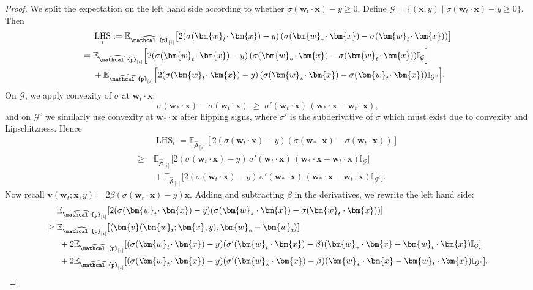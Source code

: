 \documentclass[11pt]{article}
\numberwithin{thm}{section}
\theoremstyle{plain}
\theoremstyle{definition}
\theoremstyle{remark} \newtheorem{remark}[thm]{Remark}
\def\vv{{\bm{v}}}
\def\vw{{\bm{w}}}
\def\vx{{\bm{x}}}
\def\ep{\widehat{\mathcal{p}}}
\def\cG{{\mathcal{G}}}
\newcommand{\E}{\mathbb{E}}
\newcommand{\Ind}{\mathbb{I}}
\newcommand{\innp}[1]{\langle #1 \rangle}
\newcommand{\epi}{\ep_{[i]}}
\DeclareMathOperator{\LHS}{LHS}
\begin{document}
\begin{proof}
	We split the expectation on the left hand side according to whether $\sigma(\vw_t\!\cdot\vx)-y\ge0$.  Define %
    \(\cG = \{(\vx,y)\mid \sigma(\vw_t\!\cdot\vx)-y\ge0\}\). Then
	\begin{align*}
		&\; \LHS_{i} :=  \E_{\epi}\bigl[2(\sigma(\vw_t\!\cdot\vx)-y)\,(\sigma(\vw_*\!\cdot\vx)-\sigma(\vw_t\!\cdot\vx))\bigr]\\
		=&\;\E_{\epi}\Bigl[2(\sigma(\vw_t\!\cdot\vx)-y)\,(\sigma(\vw_*\!\cdot\vx)-\sigma(\vw_t\!\cdot\vx))\Ind_{\cG}\Bigr]\\
	&\;+
		\E_{\epi}\Bigl[2(\sigma(\vw_t\!\cdot\vx)-y)\,(\sigma(\vw_*\!\cdot\vx)-\sigma(\vw_t\!\cdot\vx))\Ind_{\cG^c}\Bigr].
	\end{align*}
	On $\cG$, we apply convexity of $\sigma$ at $\vw_t\cdot\vx$:
	\[
	\sigma(\vw_*\!\cdot\vx)-\sigma(\vw_t\!\cdot\vx)
	\;\ge\;
	\sigma'(\vw_t\!\cdot\vx)\,(\vw_*\!\cdot\vx-\vw_t\!\cdot\vx),
	\]
	and on $\cG^c$ we similarly use convexity at $\vw_*\cdot\vx$ after flipping signs, where \(\sigma'\) is the subderivative of \(\sigma\) which must exist due to convexity and Lipschitzness. Hence
	\begin{align*}
		& \; \LHS_{i} = \E_{\epi}[2(\sigma(\vw_t\!\cdot\vx)-y)(\sigma(\vw_*\cdot \vx)-\sigma(\vw_t\cdot \vx))]  
		\\
		\ge & \; \E_{\epi}\bigl[2(\sigma(\vw_t\!\cdot\vx)-y)\,\sigma'(\vw_t\!\cdot\vx)\,(\vw_*\!\cdot\vx-\vw_t\!\cdot\vx)\Ind_{\cG}\bigr]\\
		&\;+
		\E_{\epi}\bigl[2(\sigma(\vw_t\!\cdot\vx)-y)\,\sigma'(\vw_*\!\cdot\vx)\,(\vw_*\!\cdot\vx-\vw_t\!\cdot\vx)\Ind_{\cG^c}\bigr].
	\end{align*}
	Now recall $\vv(\vw_t;\vx,y)=2\beta (\sigma(\vw_t\!\cdot\vx)-y)\vx$.  Adding and subtracting $\beta$ in the derivatives, we rewrite the left hand side:
	\begin{align}\label{eq:break-term2-St}
		& \E_{\epi}[2(\sigma(\vw_t\!\cdot\vx)-y)(\sigma(\vw_*\cdot \vx)-\sigma(\vw_t\cdot \vx))]  \notag\\
		\ge  \; & \E_{\epi}[\innp{\vv(\vw_t;\vx,y), \vw_*-\vw_t}] \notag \\
		&\;+2\E_{\epi}[(\sigma(\vw_t\!\cdot\vx)-y)(\sigma'(\vw_t\cdot \vx)-\beta)(\vw_*\cdot \vx-\vw_t\cdot \vx)\Ind_{\cG}] \notag \\
		&\;+ 2\E_{\epi}[(\sigma(\vw_t\!\cdot\vx)-y)(\sigma'(\vw_*\cdot \vx)-\beta)(\vw_*\cdot \vx-\vw_t\cdot \vx)\Ind_{\cG^{c}}].

\end{align}
\end{proof}
\end{document}
